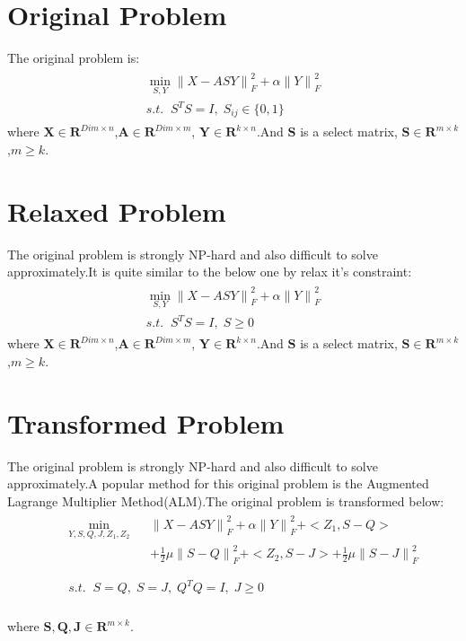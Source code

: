 \documentclass{article}
\begin{document}
\section{Original Problem}
  The original problem is\;:
\begin{eqnarray}
\begin{array}{l}
    \mathop{\min}\limits_{S, Y} {\parallel X - ASY\parallel}_F^2 + \alpha{\parallel Y\parallel}_F^2\\
    s.t. \;\; S^TS = I, \; S_{ij} \in \{0,1\}
\end{array}
\end{eqnarray}
where $\mathbf{X} \in \mathbf{R}^{Dim\times n}$,$\mathbf{A} \in \mathbf{R}^{Dim\times m}$, $\mathbf{Y} \in \mathbf{R}^{k\times n}$.And $\mathbf{S}$ is a select matrix, $\mathbf{S} \in \mathbf{R}^{m\times k}$,$m \geq k$.

\section{Relaxed Problem}
  The original problem is strongly NP-hard and also difficult to solve approximately.It is quite similar to the below one by relax it's constraint\;:
\begin{eqnarray}
\begin{array}{l}
    \mathop{\min}\limits_{S, Y} {\parallel X - ASY\parallel}_F^2 + \alpha{\parallel Y\parallel}_F^2\\
    s.t. \;\; S^TS = I, \; S \geq 0
\end{array}
\end{eqnarray}
where $\mathbf{X} \in \mathbf{R}^{Dim\times n}$,$\mathbf{A} \in \mathbf{R}^{Dim\times m}$, $\mathbf{Y} \in \mathbf{R}^{k\times n}$.And $\mathbf{S}$ is a select matrix, $\mathbf{S} \in \mathbf{R}^{m\times k}$,$m \geq k$.

\section{Transformed Problem}
The original problem is strongly NP-hard and also difficult to solve approximately.A popular method for this original problem is the Augmented Lagrange Multiplier Method(ALM).The original problem is transformed below:
\begin{eqnarray}
&& \begin{array}{lll}
\mathop{\min}\limits_{Y,S,Q,J,Z_1,Z_2 } && {\parallel X - ASY\parallel}_F^2  + \alpha{\parallel Y\parallel}_F^2 + <Z_1,S-Q> \\ && + \frac{1}{2}\mu{\parallel S - Q\parallel}_F^2
 + <Z_2,S-J> + \frac{1}{2}\mu{\parallel S - J\parallel}_F^2
\end{array}\\ \nonumber \\
&& \begin{array}{lll}
s.t. \;\; S = Q , \; S = J , \; Q^TQ = I , \; J \geq 0 \nonumber
\end{array}
\end{eqnarray}\\
where $\mathbf{S, Q, J} \in \mathbf{R}^{m\times k}$.
\end{document}
